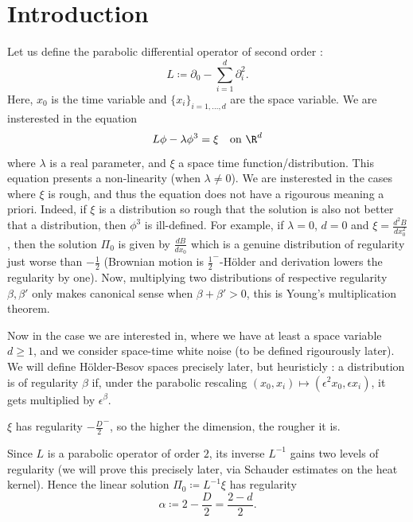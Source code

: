 \chapter{Introduction}
\label{ch:intro}
Let us define the parabolic differential operator of second order :
$$L \coloneq \partial_0 - \sum_{i=1}^{d}\partial_i^2.$$
Here, $x_0$ is the time variable and $\{x_i\}_{i=1,\dots,d}$ are the space variable.
We are insterested in the equation 
\begin{equation}
    L\phi - \lambda \phi^3 = \xi \quad \text{on }\R^d
    \label{eq:phi4}
\end{equation}
where $\lambda$ is a real parameter, and $\xi$ a space time function/distribution.
This equation presents a non-linearity (when $\lambda \neq 0$). We are insterested in the cases where $\xi$ is rough, and thus the equation does not have a rigourous meaning a priori.
Indeed, if $\xi$ is a distribution so rough that the solution is also not better that a distribution, then $\phi^3$ is ill-defined.
For example, if $\lambda = 0$, $d = 0$ and $\xi = \frac{d^2B}{dx_0^2}$, then the solution $\Pi_0$ is given by $\frac{dB}{dx_0}$ which is a genuine distribution of regularity just worse than $- \frac{1}{2}$ (Brownian motion is $\frac{1}{2}^-$-Hölder and derivation lowers the regularity by one).
Now, multiplying two distributions of respective regularity $\beta, \beta'$ only makes canonical sense when $\beta+\beta'>0$, this is Young's multiplication theorem. 

Now in the case we are interested in, where we have at least a space variable $d \geq 1$, and we consider space-time white noise (to be defined rigourously later).
We will define Hölder-Besov spaces precisely later, but heuristicly : a distribution is of regularity $\beta$ if, under the parabolic rescaling $(x_0,x_i) \mapsto (\epsilon^2 x_0, \epsilon x_i)$, it gets multiplied by $\epsilon^\beta$.

$\xi$ has regularity $-\frac{D}{2}^-$, so the higher the dimension, the rougher it is.

Since $L$ is a parabolic operator of order $2$, its inverse $L^{-1}$ gains two levels of regularity (we will prove this precisely later, via Schauder estimates on the heat kernel). Hence the linear solution $\Pi_0 \coloneq L^{-1}\xi$ has regularity
$$\alpha \coloneq 2-\frac{D}{2} = \frac{2-d}{2}.$$

